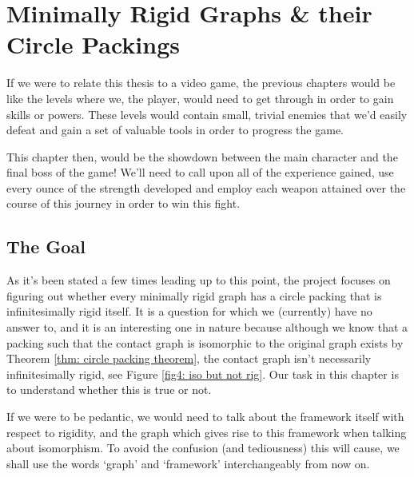\chapter{Minimally Rigid Graphs \& their Circle Packings} %
\label{ch: 4}

\begin{flushleft}
If we were to relate this thesis to a video game, the previous chapters would be like the levels where we, the player, would need to get through in order to gain skills or powers. These levels would contain small, trivial enemies that we'd easily defeat and gain a set of valuable tools in order to progress the game.    
\end{flushleft}

\begin{flushleft}
This chapter then, would be the showdown between the main character and the final boss of the game! We'll need to call upon all of the experience gained, use every ounce of the strength developed and employ each weapon attained over the course of this journey in order to win this fight.
\end{flushleft}

\section{The Goal}

\begin{flushleft}
As it's been stated a few times leading up to this point, the project focuses on figuring out whether every minimally rigid graph has a circle packing that is infinitesimally rigid itself. It is a question for which we (currently) have no answer to, and it is an interesting one in nature because although we know that a packing such that the contact graph is isomorphic to the original graph exists by Theorem \ref{thm: circle packing theorem}, the contact graph isn't necessarily infinitesimally rigid, see Figure \ref{fig4: iso but not rig}. Our task in this chapter is to understand whether this is true or not. 
\end{flushleft}

\begin{flushleft} %
If we were to be pedantic, we would need to talk about the framework itself with respect to rigidity, and the graph which gives rise to this framework when talking about isomorphism. To avoid the confusion (and tediousness) this will cause, we shall use the words `graph' and `framework' interchangeably from now on. 
\end{flushleft}

